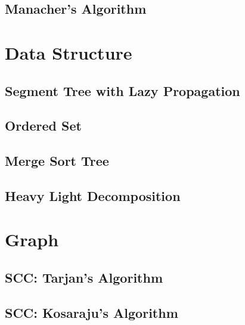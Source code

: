 \documentclass[10pt, a4paper]{article}
\begin{document}
\subsection{Manacher's Algorithm}




\section{Data Structure}

\subsection{Segment Tree with Lazy Propagation}


\subsection{Ordered Set}


\subsection{Merge Sort Tree}


\subsection{Heavy Light Decomposition}




\section{Graph}

\subsection{SCC: Tarjan's Algorithm}


\subsection{SCC: Kosaraju's Algorithm}


% 
\end{document}
